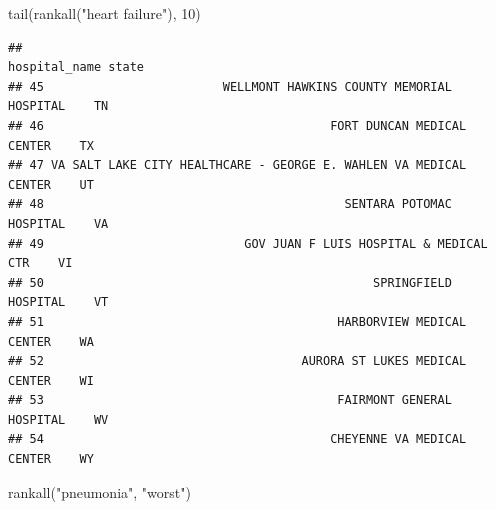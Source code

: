 \documentclass[
]{book}
\newenvironment{Shaded}{\begin{snugshade}}{\end{snugshade}}
\newcommand{\DecValTok}[1]{\textcolor[rgb]{0.00,0.00,0.81}{#1}}
\newcommand{\FunctionTok}[1]{\textcolor[rgb]{0.00,0.00,0.00}{#1}}
\newcommand{\NormalTok}[1]{#1}
\newcommand{\StringTok}[1]{\textcolor[rgb]{0.31,0.60,0.02}{#1}}
\theoremstyle{definition}
\theoremstyle{definition}
\theoremstyle{definition}
\theoremstyle{definition}
\theoremstyle{remark}
\begin{document}
\begin{Shaded}
\begin{Highlighting}[]
\FunctionTok{tail}\NormalTok{(}\FunctionTok{rankall}\NormalTok{(}\StringTok{"heart failure"}\NormalTok{), }\DecValTok{10}\NormalTok{)}
\end{Highlighting}
\end{Shaded}

\begin{verbatim}
##                                                        hospital_name state
## 45                         WELLMONT HAWKINS COUNTY MEMORIAL HOSPITAL    TN
## 46                                        FORT DUNCAN MEDICAL CENTER    TX
## 47 VA SALT LAKE CITY HEALTHCARE - GEORGE E. WAHLEN VA MEDICAL CENTER    UT
## 48                                          SENTARA POTOMAC HOSPITAL    VA
## 49                            GOV JUAN F LUIS HOSPITAL & MEDICAL CTR    VI
## 50                                              SPRINGFIELD HOSPITAL    VT
## 51                                         HARBORVIEW MEDICAL CENTER    WA
## 52                                    AURORA ST LUKES MEDICAL CENTER    WI
## 53                                         FAIRMONT GENERAL HOSPITAL    WV
## 54                                        CHEYENNE VA MEDICAL CENTER    WY
\end{verbatim}

\begin{Shaded}
\begin{Highlighting}[]
\FunctionTok{rankall}\NormalTok{(}\StringTok{"pneumonia"}\NormalTok{, }\StringTok{"worst"}\NormalTok{)}
\end{Highlighting}
\end{Shaded}
\end{document}
